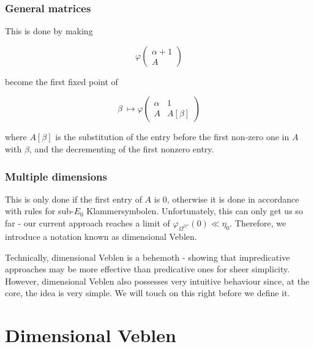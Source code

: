 \documentclass{beamer}
\begin{document}
\begin{frame}
\frametitle{General matrices}
This is done by making

\begin{equation}
\varphi\left(\begin{matrix} \alpha+1 \\ A\end{matrix}\right)
\end{equation}

become the first fixed point of

\begin{equation}
\beta\ \mapsto \varphi\left(\begin{matrix} \alpha & 1 \\ A & A[\beta]\end{matrix}\right)
\end{equation}

where $A[\beta]$ is the substitution of the entry before the first non-zero one in $A$ with $\beta$, and the decrementing of the first nonzero entry.
\end{frame}

\begin{frame}
\frametitle{Multiple dimensions}
This is only done if the first entry of $A$ is $0$, otherwise it is done in accordance with rules for sub-$E_0$ Klammersymbolen. Unfortunately, this can only get us so far - our current approach reaches a limit of $\varphi_{\Omega^{\Omega^\omega}}(0) \ll \eta_0$. Therefore, we introduce a notation known as \alert{dimensional Veblen}.

\pause

Technically, dimensional Veblen is a behemoth - showing that impredicative approaches may be more effective than predicative ones for sheer simplicity. However, dimensional Veblen also possesses very intuitive behaviour since, at the core, the idea is very simple. We will touch on this right before we define it.
\end{frame}

\section{Dimensional Veblen}
\end{document}
